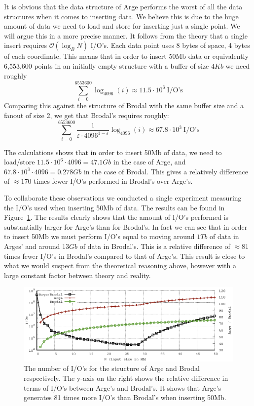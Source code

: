 \documentclass[twoside,11pt,openright]{report}
\def \epsilon {\varepsilon}
\begin{document}
It is obvious that the data structure of Arge performs the worst of all the data structures when it comes to inserting data. We believe this is due to the huge amount of data we need to load and store for inserting just a single point. We will argue this in a more precise manner. It follows from the theory that a single insert requires $\mathcal{O}(\log_B N)$ I/O's. Each data point uses 8 bytes of space, 4 bytes of each coordinate. This means that in order to insert 50Mb data or equivalently 6,553,600 points in an initially empty structure with a buffer of size $4Kb$ we need roughly $$\sum\limits_{i=0}^{6553600} \log_{4096}(i) \approx 11.5 \cdot 10^6~\text{I/O's}$$
Comparing this against the structure of Brodal with the same buffer size and a fanout of size 2, we get that Brodal's requires roughly:
$$\sum\limits_{i=0}^{6553600} \frac{1}{\epsilon \cdot 4096^{1-\epsilon}} \log_{4096}(i) \approx 67.8\cdot 10^3~\text{I/O's}$$

The calculations shows that in order to insert 50Mb of data, we need to load/store $11.5 \cdot 10^6 \cdot 4096 = 47.1Gb$ in the case of Arge, and $67.8\cdot 10^3 \cdot 4096 = 0.278Gb$ in the case of Brodal. This gives a relatively difference of $\approx 170$ times fewer I/O's performed in Brodal's over Arge's.

To collaborate these observations we conducted a single experiment measuring the I/O's used when inserting 50Mb of data. The results can be found in Figure~\ref{fig:arge_brodal_ios}. The results clearly shows that the amount of I/O's performed is substantially larger for Arge's than for Brodal's. In fact we can see that in order to insert 50Mb we must perform I/O's equal to moving around $1Tb$ of data in Arges' and around $13Gb$ of data in Brodal's. This is a relative difference of $\approx 81$ times fewer I/O's in Brodal's compared to that of Arge's. This result is close to what we would suspect from the theoretical reasoning above, however with a large constant factor between theory and reality.

\begin{figure}[t]
\centering
\includegraphics[width=\textwidth]{../src/experiments/insert_experiment_results/2016-05-21.14_06_50/ios}
\caption{The number of I/O's for the structure of Arge and Brodal respectively. The y-axis on the right shows the relative difference in terms of I/O's between Arge's and Brodal's. It shows that Arge's generates 81 times more I/O's than Brodal's when inserting 50Mb.}
\label{fig:arge_brodal_ios}
\end{figure}
\end{document}

